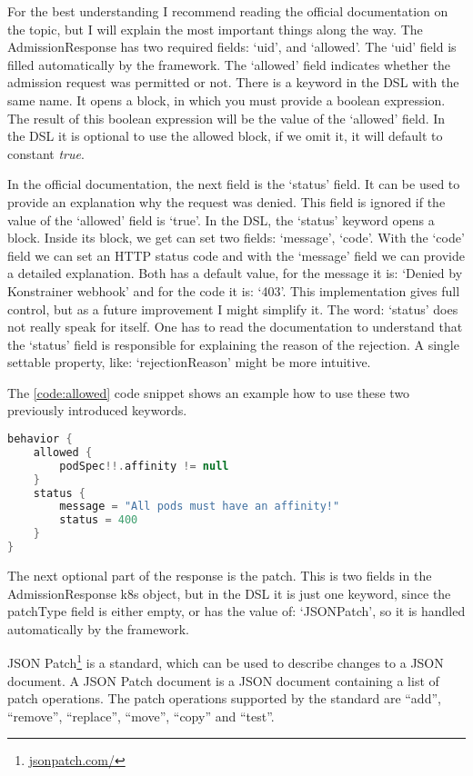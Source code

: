 For the best understanding I recommend reading the official documentation on the topic, but I will explain the most important things along the way. The AdmissionResponse has two required fields: `uid', and `allowed'. The `uid' field is filled automatically by the framework. The `allowed' field indicates whether the admission request was permitted or not. There is a keyword in the DSL with the same name. It opens a block, in which you must provide a boolean expression. The result of this boolean expression will be the value of the `allowed' field. In the DSL it is optional to use the allowed block, if we omit it, it will default to constant \emph{true}.

In the official documentation, the next field is the `status' field. It can be used to provide an explanation why the request was denied. This field is ignored if the value of the `allowed' field is `true'. In the DSL, the `status' keyword opens a block. Inside its block, we get can set two fields: `message', `code'. With the `code' field we can set an HTTP status code and with the `message' field we can provide a detailed explanation. Both has a default value, for the message it is: `Denied by Konstrainer webhook' and for the code it is: `403'. This implementation gives full control, but as a future improvement I might simplify it. The word: `status' does not really speak for itself. One has to read the documentation to understand that the `status' field is responsible for explaining the reason of the rejection. A single settable property, like: `rejectionReason' might be more intuitive.

The \ref{code:allowed} code snippet shows an example how to use these two previously introduced keywords.

\begin{lstlisting}[caption={Allowed and status},language=Kotlin,label=code:allowed]
behavior {
    allowed {
        podSpec!!.affinity != null
    }
    status {
        message = "All pods must have an affinity!"
        status = 400
    }
}
\end{lstlisting}

The next optional part of the response is the patch. This is two fields in the AdmissionResponse k8s object, but in the DSL it is just one keyword, since the patchType field is either empty, or has the value of: `JSONPatch', so it is handled automatically by the framework. 

JSON Patch\footnote{\url{jsonpatch.com/}} is a standard, which can be used to describe changes to a JSON document. A JSON Patch document is a JSON document containing a list of patch operations. The patch operations supported by the standard are “add”, “remove”, “replace”, “move”, “copy” and “test”.

